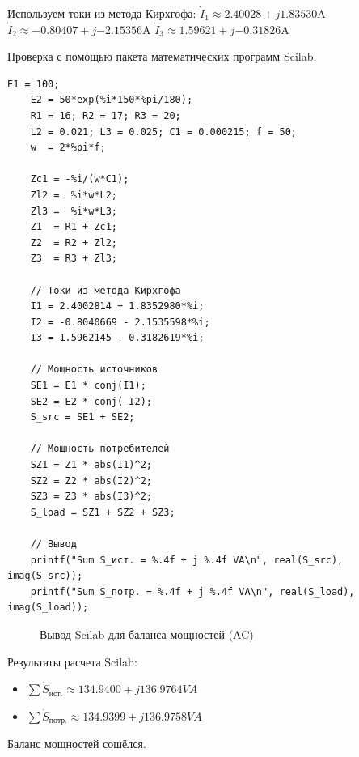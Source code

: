 \documentclass[14pt, a4paper]{styles/gost-7-32} %
\newcommand{\complex}[2]{{#1} + j{#2}}
\begin{document}
Используем токи из метода Кирхгофа:
$\dot{I}_1 \approx \complex{2.40028}{1.83530} \si{\ampere}$
$\dot{I}_2 \approx \complex{-0.80407}{-2.15356} \si{\ampere}$
$\dot{I}_3 \approx \complex{1.59621}{-0.31826} \si{\ampere}$

Проверка с помощью пакета математических программ Scilab.
\begin{lstlisting}[caption=Расчет баланса мощностей (Scilab), label=lst:scilab_balance2]
    E1 = 100;
    E2 = 50*exp(%i*150*%pi/180);
    R1 = 16; R2 = 17; R3 = 20;
    L2 = 0.021; L3 = 0.025; C1 = 0.000215; f = 50;
    w  = 2*%pi*f;
    
    Zc1 = -%i/(w*C1);
    Zl2 =  %i*w*L2;
    Zl3 =  %i*w*L3;
    Z1  = R1 + Zc1;
    Z2  = R2 + Zl2;
    Z3  = R3 + Zl3;
    
    // Токи из метода Кирхгофа
    I1 = 2.4002814 + 1.8352980*%i;
    I2 = -0.8040669 - 2.1535598*%i;
    I3 = 1.5962145 - 0.3182619*%i;
    
    // Мощность источников
    SE1 = E1 * conj(I1);
    SE2 = E2 * conj(-I2);
    S_src = SE1 + SE2;
    
    // Мощность потребителей
    SZ1 = Z1 * abs(I1)^2;
    SZ2 = Z2 * abs(I2)^2;
    SZ3 = Z3 * abs(I3)^2;
    S_load = SZ1 + SZ2 + SZ3;
    
    // Вывод
    printf("Sum S_ист. = %.4f + j %.4f VA\n", real(S_src),  imag(S_src));
    printf("Sum S_потр. = %.4f + j %.4f VA\n", real(S_load), imag(S_load));
    \end{lstlisting}
    
    \begin{figure}[H]
        \centering
        \caption{Вывод Scilab для баланса мощностей (AC)}
        \label{fig:scilab_balance2_out}
      \end{figure}
      
Результаты расчета Scilab:
\begin{itemize}
    \item $\sum \dot{S}_{ист.} \approx \complex{134.9400}{136.9764} \si{VA}$
    \item $\sum \dot{S}_{потр.} \approx \complex{134.9399}{136.9758} \si{VA}$
\end{itemize}
Баланс мощностей сошёлся.
\end{document}
